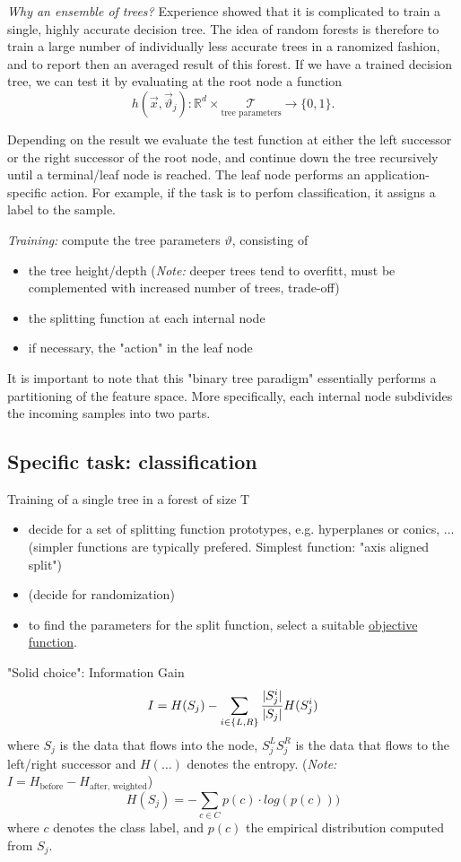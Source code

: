 \documentclass{scrartcl}
\DeclarePairedDelimiter\abs{\lvert}{\rvert}%
\begin{document}
\textit{Why an ensemble of trees?} Experience showed that it is complicated to train a single, highly accurate decision tree. The idea of random forests is therefore to train a large number of individually less accurate trees in a ranomized fashion, and to report then an averaged result of this forest. 
If we have a trained decision tree, we can test it by evaluating at the root node a function
\[h(\vec{x}, \vec{\vartheta}_j): \mathbb{R}^d \times \underset{\text{tree parameters}}{\mathcal{T}} \rightarrow \{0, 1\}.\]

Depending on the result we evaluate the test function at either the left successor or the right successor of the root node, and continue down the tree recursively until a terminal/leaf node is reached.
The leaf node performs an application-specific action. For example, if the task is to perfom classification, it assigns a label to the sample.


\textit{Training:} compute the tree parameters \(\vartheta\), consisting of
\begin{itemize}
    \item
        the tree height/depth (\textit{Note:} deeper trees tend to overfitt, must be complemented with increased number of trees, trade-off)
    \item
        the splitting function at each internal node
    \item
        if necessary, the "action" in the leaf node
\end{itemize}

It is important to note that this "binary tree paradigm" essentially performs a partitioning of the feature space. More specifically, each internal node subdivides the incoming samples into two parts.

\subsection{Specific task: classification}
Training of a single tree in a forest of size T
\begin{itemize}
    \item
        decide for a set of splitting function prototypes, e.g. hyperplanes or conics, ... (simpler functions are typically prefered. Simplest function: "axis aligned split")
    \item
        (decide for randomization)
    \item
        to find the parameters for the split function, select a suitable \underline{objective function}. 
\end{itemize}
"Solid choice": Information Gain
\[I = H(S_j) - \sum_{i \in \{L,R\}} \frac{\abs{S^i_j}}{\abs{S_j}} H(S^i_j)\]
where \(S_j\) is the data that flows into the node, \(S^L_j S^R_j\) is the data that flows to the left/right successor and \(H(\dots)\) denotes the entropy. (\textit{Note:} \(I = H_{\text{before}} - H_{\text{after, weighted}}\))
\[H(S_j) = -\sum_{c \in C} p(c) \cdot log(p(c)))\] 
where \(c\) denotes the class label, and \(p(c)\) the empirical distribution computed from \(S_j\). 
\end{document}
